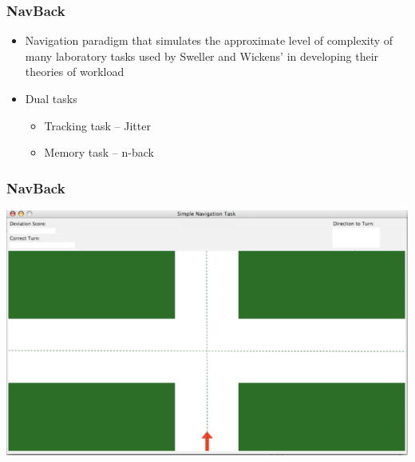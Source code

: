 \documentclass{beamer}
\begin{document}
\begin{frame}
	\frametitle{NavBack}
	\begin{itemize}
		\item Navigation paradigm that simulates the approximate level of complexity of many laboratory tasks used by Sweller and Wickens' in developing their theories of workload
		\item Dual tasks
		\begin{itemize}
			\item Tracking task -- Jitter
			\item Memory task -- n-back
		\end{itemize}
	\end{itemize}
\end{frame}

\begin{frame} 
	\frametitle{NavBack}
	\begin{center}
		\includegraphics[width=.75\textwidth]{../zNvBkFigs/NavBack}
	\end{center}


\end{frame}
\end{document}

